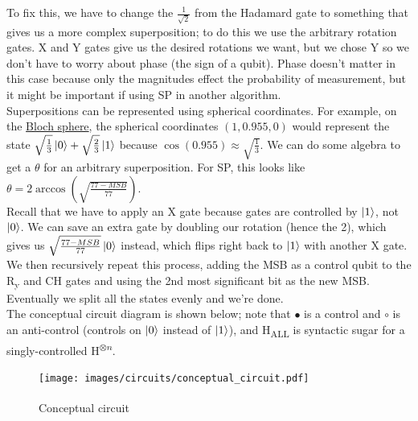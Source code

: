 \documentclass[12pt]{article}
\begin{document}
\noindent To fix this, we have to change the $\frac{1}{\sqrt{2}}$ from the Hadamard gate to something that gives us a more complex superposition; to do this we use the arbitrary rotation gates. X and Y gates give us the desired rotations we want, but we chose Y so we don't have to worry about phase (the sign of a qubit). Phase doesn't matter in this case because only the magnitudes effect the probability of measurement, but it might be important if using SP in another algorithm. \\
\indent Superpositions can be represented using spherical coordinates. For example, on the \hyperref[fig:bsphere]{Bloch sphere}, the spherical coordinates $(1, 0.955, 0)$ would represent the state $\sqrt{\frac{1}{3}} \ket{0} + \sqrt{\frac{2}{3}} \ket{1}$ because $\cos (0.955) \approx \sqrt{\frac{1}{3}}$. We can do some algebra to get a $\theta$ for an arbitrary superposition. For SP, this looks like $\theta = 2\arccos\left(\sqrt{\frac{77 - MSB}{77}}\right)$. \\
\indent Recall that we have to apply an X gate because gates are controlled by $\ket{1}$, not $\ket{0}$. We can save an extra gate by doubling our rotation (hence the 2), which gives us $\sqrt{\frac{77 - MSB}{77}} \ket{0}$ instead, which flips right back to $\ket{1}$ with another X gate. \\
\indent We then recursively repeat this process, adding the MSB as a control qubit to the R\textsubscript{y} and CH gates and using the 2nd most significant bit as the new MSB. Eventually we split all the states evenly and we're done. \\

\noindent The conceptual circuit diagram is shown below; note that $\bullet$ is a control and $\circ$ is an anti-control (controls on $\ket{0}$ instead of $\ket{1}$), and H\textsubscript{ALL} is syntactic sugar for a singly-controlled H\textsuperscript{$\otimes n$}.
\begin{figure}[H]
    \centering
    \texttt{[image: images/circuits/conceptual\_circuit.pdf]}
    \caption{Conceptual circuit\textsuperscript{\cite{chuang}}}
    \label{fig:circs}
\end{figure}
\end{document}
